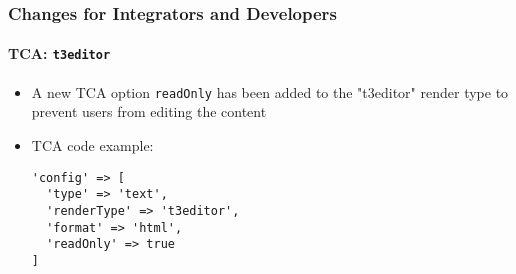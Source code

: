 %

\begin{frame}[fragile]
	\frametitle{Changes for Integrators and Developers}
	\framesubtitle{TCA: \texttt{t3editor}}


	\begin{itemize}
		\item A new TCA option \texttt{readOnly} has been added to the "t3editor"
			render type to prevent users from editing the content
		\item TCA code example:
\begin{lstlisting}
'config' => [
  'type' => 'text',
  'renderType' => 't3editor',
  'format' => 'html',
  'readOnly' => true
]
\end{lstlisting}

	\end{itemize}

\end{frame}

